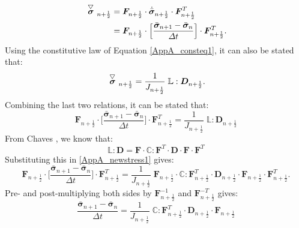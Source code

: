 {{\begin{equation}
\begin{split}
\acctriang{\boldsymbol{\sigma}}_{n+\frac{1}{2}} &= \boldsymbol{F}_{n+\frac{1}{2}}\cdot\dot{\bar{\boldsymbol{\sigma}}}_{n+\frac{1}{2}}\cdot\boldsymbol{F}_{n+\frac{1}{2}}^{T}\\
&=\boldsymbol{F}_{n+\frac{1}{2}}\cdot\Big[\frac{\bar{\boldsymbol{\sigma}}_{n+1}-\bar{\boldsymbol{\sigma}}_{n}}{\Delta t}\Big]\cdot\boldsymbol{F}_{n+\frac{1}{2}}^{T}.
\end{split}
\end{equation}
Using the constitutive law of Equation \ref{AppA_consteq1}, it can also be stated that:
\begin{equation}
\acctriang{\boldsymbol{\sigma}}_{n+\frac{1}{2}} = \frac{1}{J_{n+\frac{1}{2}}}\; \boldsymbol{\mathbb L}:\boldsymbol{D}_{n+\frac{1}{2}}.
\end{equation} 
Combining the last two relations, it can be stated that:
\begin{equation}\label{AppA_newstress1}
\boldsymbol{F}_{n+\frac{1}{2}}\cdot\Big[\frac{\bar{\boldsymbol{\sigma}}_{n+1}-\bar{\boldsymbol{\sigma}}_{n}}{\Delta t}\Big]\cdot\boldsymbol{F}_{n+\frac{1}{2}}^{T} = \frac{1}{J_{n+\frac{1}{2}}}\; \boldsymbol{\mathbb L}:\boldsymbol{D}_{n+\frac{1}{2}}
\end{equation}
From Chaves \cite{chaves}, we know that:
\begin{equation}
\boldsymbol{\mathbb L}:\boldsymbol{D} = \boldsymbol{F}\cdot\boldsymbol{\mathbb C}:\boldsymbol{F}^T\cdot\boldsymbol{D}\cdot\boldsymbol{F}\cdot\boldsymbol{F}^T
\end{equation}
Substituting this in \ref{AppA_newstress1} gives:
\begin{equation}
\boldsymbol{F}_{n+\frac{1}{2}}\cdot\Big[\frac{\bar{\boldsymbol{\sigma}}_{n+1}-\bar{\boldsymbol{\sigma}}_{n}}{\Delta t}\Big]\cdot\boldsymbol{F}_{n+\frac{1}{2}}^{T} = \frac{1}{J_{n+\frac{1}{2}}}\; \boldsymbol{F}_{n+\frac{1}{2}}\cdot\boldsymbol{\mathbb C}:\boldsymbol{F}_{n+\frac{1}{2}}^T\cdot\boldsymbol{D}_{n+\frac{1}{2}}\cdot\boldsymbol{F}_{n+\frac{1}{2}}\cdot\boldsymbol{F}_{n+\frac{1}{2}}^T.
\end{equation}
Pre- and post-multiplying both sides by $\boldsymbol{F}_{n+\frac{1}{2}}^{-1}$ and $\boldsymbol{F}_{n+\frac{1}{2}}^{-T}$ gives:
\begin{equation}
\frac{\bar{\boldsymbol{\sigma}}_{n+1}-\bar{\boldsymbol{\sigma}}_{n}}{\Delta t}= \frac{1}{J_{n+\frac{1}{2}}}\; \boldsymbol{\mathbb C}:\boldsymbol{F}_{n+\frac{1}{2}}^T\cdot\boldsymbol{D}_{n+\frac{1}{2}}\cdot\boldsymbol{F}_{n+\frac{1}{2}}
\end{equation}





}}
